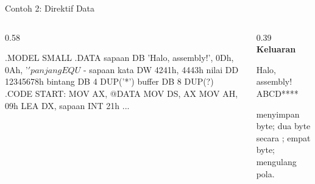 \documentclass[aspectratio=169,11pt]{beamer}
\begin{document}
\begin{frame}[fragile]{Contoh 2: Direktif Data}
\begin{columns}[t]
\begin{column}{0.58\textwidth}
\begin{kodeasm}
.MODEL SMALL
.DATA
    sapaan  DB 'Halo, assembly!', 0Dh, 0Ah, '$'
    panjang EQU $ - sapaan
    kata    DW 4241h, 4443h
    nilai   DD 12345678h
    bintang DB 4 DUP('*')
    buffer  DB 8 DUP(?)
.CODE
START:
    MOV AX, @DATA
    MOV DS, AX
    MOV AH, 09h
    LEA DX, sapaan
    INT 21h
...
\end{kodeasm}
\end{column}
\begin{column}{0.39\textwidth}
\footnotesize
{\color{obeTeal}\bfseries Keluaran}\\[0.15em]
\begin{keluaran}
Halo, assembly!
ABCD****
\end{keluaran}

\vspace{0.3em}
 menyimpan byte;  dua byte secara
;  empat byte;  mengulang
pola.
\end{column}
\end{columns}
\end{frame}
\end{document}
